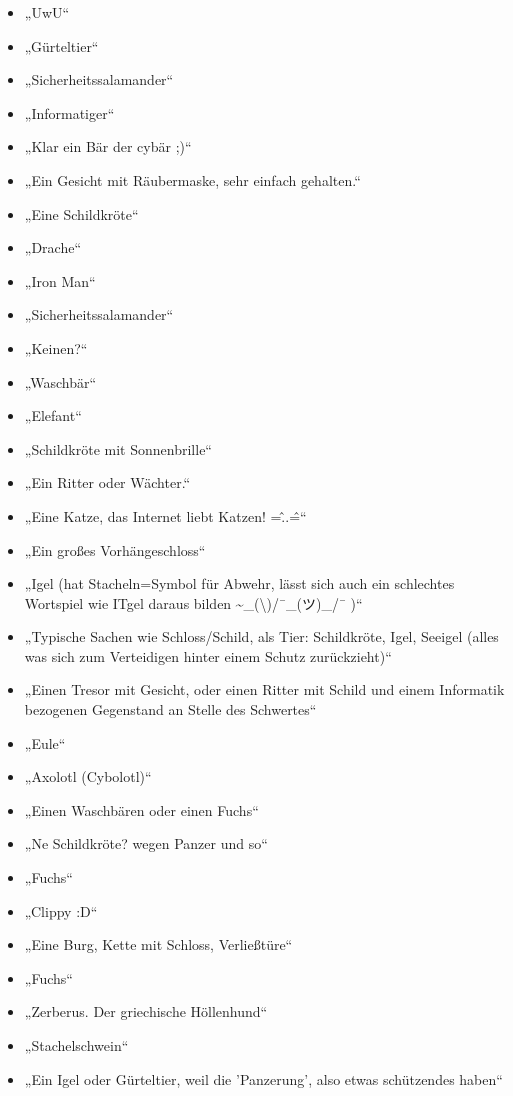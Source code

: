 \documentclass[german,report]{i1thesis}
\begin{document}
\begin{itemize}
    \item „UwU“
    \item „Gürteltier“
    \item „Sicherheitssalamander“
    \item „Informatiger“
    \item „Klar ein Bär der cybär ;)“
    \item „Ein Gesicht mit Räubermaske, sehr einfach gehalten.“
    \item „Eine Schildkröte“
    \item „Drache“
    \item „Iron Man“
    \item „Sicherheitssalamander“
    \item „Keinen?“
    \item „Waschbär“
    \item „Elefant“
    \item „Schildkröte mit Sonnenbrille“
    \item „Ein Ritter oder Wächter.“
    \item „Eine Katze, das Internet liebt Katzen! =\^..\^=“
    \item „Ein großes Vorhängeschloss“
    \item „Igel (hat Stacheln=Symbol für Abwehr, lässt sich auch ein schlechtes Wortspiel wie ITgel daraus bilden \textasciitilde\_(\textdollar\textbackslash)\textunderscore/¯\_(ツ)\_/¯ )“
    \item „Typische Sachen wie Schloss/Schild, als Tier: Schildkröte, Igel, Seeigel (alles was sich zum Verteidigen hinter einem Schutz zurückzieht)“
    \item „Einen Tresor mit Gesicht, oder einen Ritter mit Schild und einem Informatik bezogenen Gegenstand an Stelle des Schwertes“
    \item „Eule“
    \item „Axolotl (Cybolotl)“
    \item „Einen Waschbären oder einen Fuchs“
    \item „Ne Schildkröte? wegen Panzer und so“
    \item „Fuchs“
    \item „Clippy :D“
    \item „Eine Burg, Kette mit Schloss, Verließtüre“
    \item „Fuchs“
    \item „Zerberus. Der griechische Höllenhund“
    \item „Stachelschwein“
    \item „Ein Igel oder Gürteltier, weil die 'Panzerung', also etwas schützendes haben“

\end{itemize}
\end{document}
